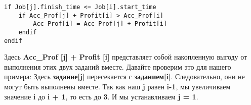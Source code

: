 \vspace{\baselineskip}
\begin{tcolorbox}
\begin{verbatim}
if Job[j].finish_time <= Job[i].start_time
	if Acc_Prof[j] + Profit[i] > Acc_Prof[i]
		Acc_Prof[i] = Acc_Prof[j] + Profit[i]
	endif
endif
\end{verbatim}
\end{tcolorbox}

\vspace{\baselineskip}
Здесь \textbf{Acc\_Prof [j] + Profit [i]} представляет собой накопленную выгоду от выполнения этих двух заданий вместе. Давайте проверим это для нашего примера: Здесь \textbf{задание[j]} пересекается с \textbf{заданием[i]}. Следовательно, они не могут быть выполнены вместе. Так как наш \textbf{j} равен \textbf{i-1}, мы увеличиваем значение \textbf{i} до \textbf{i + 1}, то есть до \textbf{3}. И мы устанавливаем \textbf{j = 1}. 

